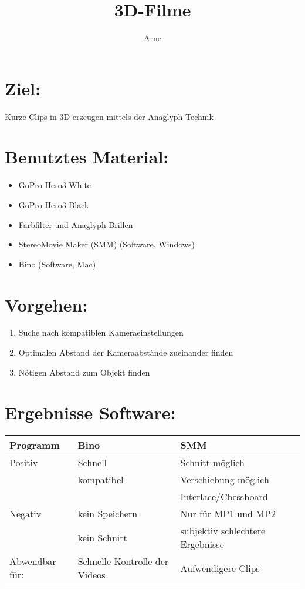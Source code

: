 

\title{3D-Filme}
\author{Arne}



\section{Ziel:}
Kurze Clips in 3D erzeugen mittels der Anaglyph-Technik

\section{Benutztes Material:} 
\begin{itemize}
	\item GoPro Hero3 White
	\item GoPro Hero3 Black
	\item Farbfilter und Anaglyph-Brillen
	\item StereoMovie Maker (SMM) (Software, Windows)
	\item Bino (Software, Mac)
\end{itemize}

\section{Vorgehen:} 
\begin{enumerate}
	\item Suche nach kompatiblen Kameraeinstellungen
	\item Optimalen Abstand der Kameraabstände zueinander finden
	\item Nötigen Abstand zum Objekt finden
\end{enumerate}

\section{Ergebnisse Software:}

\begin{tabular}{l l l}
  \toprule
  Programm & Bino & SMM\\
  \midrule 
  Positiv & Schnell & Schnitt möglich\\
          & kompatibel & Verschiebung möglich\\
          & & Interlace/Chessboard\\
  Negativ & kein Speichern & Nur für MP1 und MP2\\
          & kein Schnitt & subjektiv schlechtere Ergebnisse\\
  Abwendbar für: & Schnelle Kontrolle der Videos & Aufwendigere Clips\\
  \bottomrule
\end{tabular}

